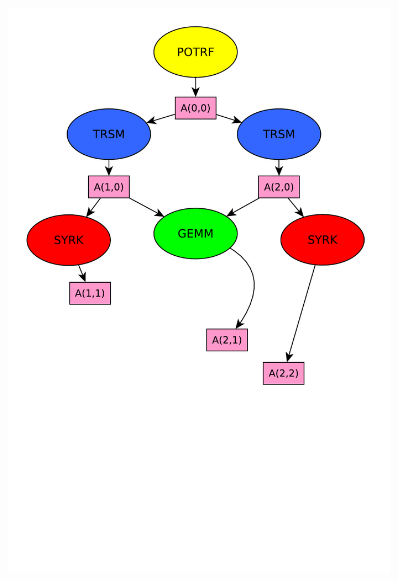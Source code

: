 \documentclass[xcolor={usenames,dvipsnames,svgnames,table}, aspectratio=43]{beamer}
\begin{document}
\begin{frame}[fragile]
\begin{minipage}[t]{0.46\linewidth}
\begin{figure}
{    \includegraphics[width=0.9\textwidth]{graph/anim-dag/anim-4.pdf}%
  }%
\end{figure}
\end{minipage}
\end{frame}
\end{document}
